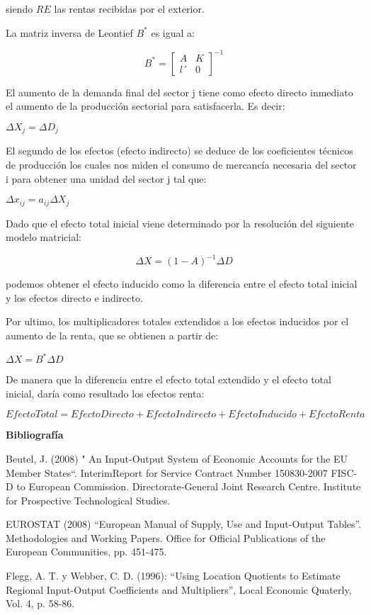 \documentclass{article}
\begin{document}
siendo $RE$ las rentas recibidas por el exterior.

La matriz inversa de Leontief $B^*$ es igual a:

$$B^*=\begin{bmatrix}{A}&{K}\\{l´}&{0}\end{bmatrix}^{-1}$$

El aumento de la demanda final del sector j  tiene como efecto directo inmediato el aumento de la producción sectorial para satisfacerla. Es decir:

$\Delta X_j=\Delta D_j$


El segundo de los efectos (efecto indirecto) se deduce de los coeficientes técnicos de producción los cuales nos miden el consumo de mercancía necesaria del sector i para obtener una unidad del sector j tal que:

$\Delta x_{ij}=a_{ij}\Delta X_j$


Dado que el efecto total inicial viene determinado por la resolución del siguiente modelo matricial:

$$\Delta X=(1-A)^{-1}\Delta D$$

podemos obtener el efecto inducido como la diferencia entre el efecto total inicial y los efectos directo e indirecto.



Por ultimo, los multiplicadores totales extendidos a los efectos inducidos por el aumento de la renta, que se obtienen a partir de:

$\Delta X= B^* \Delta D$

De manera que la diferencia entre el efecto total extendido y el efecto total inicial, daría como resultado los efectos renta:


$$Efecto Total = Efecto Directo + Efecto Indirecto + Efecto Inducido + Efecto Renta$$


{\bf Bibliografía }

Beutel, J. (2008) " An Input-Output System of Economic Accounts for the EU Member States“. InterimReport for Service Contract Number 150830-2007 FISC-D to European Commission. Directorate-General Joint Research Centre. Institute for Prospective Technological Studies.

EUROSTAT (2008) “European Manual of Supply, Use and Input-Output Tables”. Methodologies and Working Papers. Office for Official Publications of the European Communities, pp. 451-475.

Flegg, A. T. y Webber, C. D. (1996): “Using Location Quotients to Estimate Regional Input-Output Coefficients and Multipliers”, Local Economic Quaterly, Vol. 4, p. 58-86.
\end{document}
